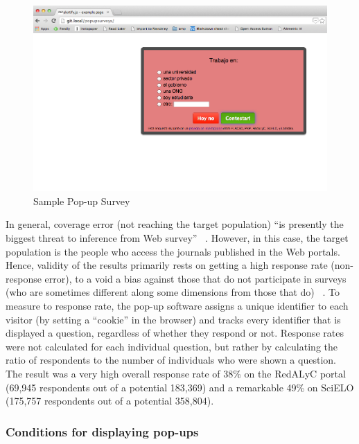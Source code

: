 \begin{figure}[htbp]
\centering
\includegraphics[keepaspectratio,width=\textwidth,height=0.75\textheight]{figures/pop-up_survey_sample.png}
\caption{Sample Pop-up Survey}
\label{pop-up_survey_sample}
\end{figure}

In general, coverage error (not reaching the target population) ``is presently the biggest threat to inference from Web survey'' ~\citep[p. 467]{Couper2000}. However, in this case, the target population is the people who access the journals published in the Web portals. Hence, validity of the results primarily rests on getting a high response rate (non-response error), to a void a bias against those that do not participate in surveys (who are sometimes different along some dimensions from those that do) ~\citep{Couper2000,Vaske2008}. To measure to response rate, the pop-up software assigns a unique identifier to each visitor (by setting a ``cookie'' in the browser) and tracks every identifier that is displayed a question, regardless of whether they respond or not. Response rates were not calculated for each individual question, but rather by calculating the ratio of respondents to the number of individuals who were shown a question. The result was a very high overall response rate of 38\% on the RedALyC portal (69,945 respondents out of a potential 183,369) and a remarkable 49\% on SciELO (175,757 respondents out of a potential 358,804).

\subsubsection{Conditions for displaying pop-ups}
\label{conditionsfordisplayingpop-ups}

